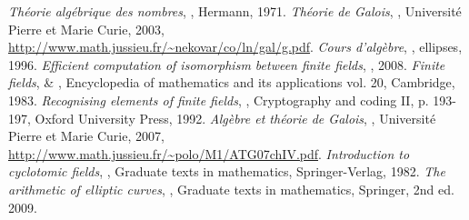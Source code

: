 \documentclass[a4paper]{article} %
\numberwithin{equation}{section}
\begin{document}
\begin{thebibliography}{LC}
 \emph{Théorie algébrique des nombres}, , Hermann, 1971.
 \emph{Théorie de Galois}, , Université Pierre et Marie Curie, 2003,  \url{http://www.math.jussieu.fr/~nekovar/co/ln/gal/g.pdf}.
 \emph{Cours d'algèbre}, , ellipses, 1996.
 \emph{Efficient computation of isomorphism between finite fields}, , 2008.
 \emph{Finite fields},  \& , Encyclopedia of mathematics and its applications vol. 20, Cambridge, 1983.
 \emph{Recognising elements of finite fields}, , Cryptography and coding II, p. 193-197, Oxford University Press, 1992.
 \emph{Algèbre et théorie de Galois}, , Université Pierre et Marie Curie, 2007,  \url{http://www.math.jussieu.fr/~polo/M1/ATG07chIV.pdf}.
 \emph{Introduction to cyclotomic fields}, , Graduate texts in mathematics, Springer-Verlag, 1982.
 \emph{The arithmetic of elliptic curves}, , Graduate texts in mathematics, Springer, 2nd ed. 2009.
\end{thebibliography}
\end{document}
